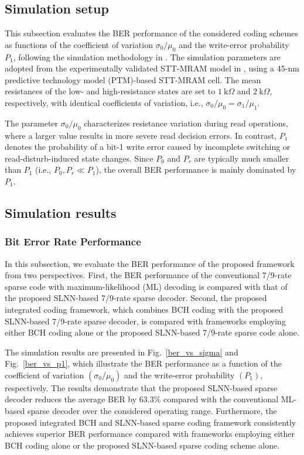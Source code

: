 \documentclass[conference]{IEEEtran}
\begin{document}
\subsection{Simulation setup}

This subsection evaluates the BER performance of the considered coding schemes as functions of the coefficient of variation $\sigma_0/\mu_0$ and the write-error probability $P_1$, following the simulation methodology in \cite{an2025sparse,nguyen2021design}. The simulation parameters are adopted from the experimentally validated STT-MRAM model in \cite{cai2017cascaded,zhang2011stt}, using a 45-nm predictive technology model (PTM)-based STT-MRAM cell. The mean resistances of the low- and high-resistance states are set to $1~\mathrm{k}\Omega$ and $2~\mathrm{k}\Omega$, respectively, with identical coefficients of variation, i.e., $\sigma_0/\mu_0=\sigma_1/\mu_1$.

The parameter $\sigma_0/\mu_0$ characterizes resistance variation during read operations, where a larger value results in more severe read decision errors. In contrast, $P_1$ denotes the probability of a bit-1 write error caused by incomplete switching or read-disturb-induced state changes. Since $P_0$ and $P_r$ are typically much smaller than $P_1$ (i.e., $P_0,P_r\ll P_1$), the overall BER performance is mainly dominated by $P_1$.



\subsection{Simulation results}
\subsubsection{Bit Error Rate Performance}

In this subsection, we evaluate the BER performance of the proposed framework from two perspectives. First, the BER performance of the conventional 7/9-rate sparse code with maximum-likelihood (ML) decoding \cite{nguyen2021design} is compared with that of the proposed SLNN-based 7/9-rate sparse decoder. Second, the proposed integrated coding framework, which combines BCH coding with the proposed SLNN-based 7/9-rate sparse decoder, is compared with frameworks employing either BCH coding alone or the proposed SLNN-based 7/9-rate sparse code alone.

The simulation results are presented in Fig.~\ref{ber_vs_sigma} and Fig.~\ref{ber_vs_p1}, which illustrate the BER performance as a function of the coefficient of variation $(\sigma_0/\mu_0)$ and the write-error probability $(P_1)$, respectively. The results demonstrate that the proposed SLNN-based sparse decoder reduces the average BER by 63.3\% compared with the conventional ML-based sparse decoder over the considered operating range. Furthermore, the proposed integrated BCH and SLNN-based sparse coding framework consistently achieves superior BER performance compared with frameworks employing either BCH coding alone or the proposed SLNN-based sparse coding scheme alone.
\end{document}
